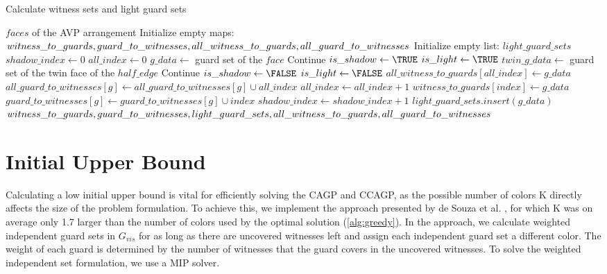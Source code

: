 \begin{algorithm}
\caption{Calculate witness sets and light guard sets}\label{alg:AVP_processing}
\begin{algorithmic}[1]
\REQUIRE $faces$ of the AVP arrangement
\STATE Initialize empty maps: $witness\_to\_guards, guard\_to\_witnesses, all\_witness\_to\_guards,\linebreak all\_guard\_to\_witnesses$
\STATE Initialize empty list: $light\_guard\_sets$
\STATE $shadow\_index\gets 0$
\STATE $all\_index\gets 0$
    \STATE $g\_data\gets$ guard set of the $face$
        \STATE Continue
    \ENDIF
    \STATE $is\_shadow\gets \TRUE$
    \STATE $is\_light\gets \TRUE$
        \STATE $twin\_g\_data\gets$ guard set of the twin face of the $half\_edge$
            \STATE Continue
        \ENDIF
            \STATE $is\_shadow\gets \FALSE$
        \ENDIF
            \STATE $is\_light\gets \FALSE$
        \ENDIF
    \ENDFOR
    \STATE $all\_witness\_to\_guards[all\_index]\gets g\_data$
        \STATE $all\_guard\_to\_witnesses[g]\gets all\_guard\_to\_witnesses[g]\cup all\_index$
    \ENDFOR
    \STATE $all\_index\gets all\_index + 1$
        \STATE $witness\_to\_guards[index]\gets g\_data$
            \STATE $guard\_to\_witnesses[g]\gets guard\_to\_witnesses[g]\cup index$
        \ENDFOR
        \STATE $shadow\_index\gets shadow\_index + 1$
    \ENDIF
        \STATE $light\_guard\_sets.insert(g\_data)$
    \ENDIF
\ENDFOR
\RETURN $witness\_to\_guards, guard\_to\_witnesses, light\_guard\_sets, all\_witness\_to\_guards,\linebreak all\_guard\_to\_witnesses$
\end{algorithmic}
\end{algorithm}

\section{Initial Upper Bound}
Calculating a low initial upper bound is vital for efficiently solving the CAGP and CCAGP, as the possible number of colors K directly affects the size of the problem formulation. To achieve this, we implement the approach presented by de Souza et al. \cite{zambon2014exact}, for which K was on average only 1.7 larger than the number of colors used by the optimal solution (\cref{alg:greedy}). In the approach, we calculate weighted independent guard sets in $G_{vis}$ for as long as there are uncovered witnesses left and assign each independent guard set a different color. The weight of each guard is determined by the number of witnesses that the guard covers in the uncovered witnesses. To solve the weighted independent set formulation, we use a MIP solver.

